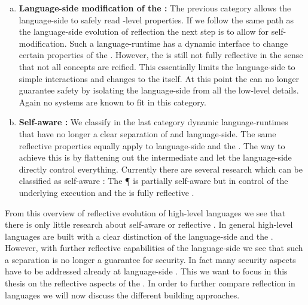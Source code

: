 \begin{enumerate}[a)]
\item \textbf{Language-side modification of the \VM:}
	The previous category allows the language-side to safely read \VM-level properties.
	If we follow the same path as the language-side evolution of reflection the next step is to allow for self-modification.
	Such a language-runtime has a dynamic interface to change certain properties of the \VM.
	However, the \VM is still not fully reflective in the sense that not all \VM concepts are reified.
	This essentially limits the language-side to simple interactions and changes to the \VM itself.
	At this point the \VM can no longer guarantee safety by isolating the language-side from all the low-level details.
	Again no systems are known to fit in this category.
	
\item \textbf{Self-aware \VM:}
	We classify in the last category dynamic language-runtimes that have no longer a clear separation of \VM and language-side.
	The same reflective properties equally apply to language-side and the \VM.
	The way to achieve this is by flattening out the intermediate \VM and let the language-side directly control everything.
	Currently there are several research \VMs which can be classified as self-aware \VMs: The \P \VM \cite{Verw12a} is partially self-aware but in control of the underlying execution and the \Klein \VM is fully reflective \cite{Unga05a}. 
\end{enumerate}

\noindent From this overview of reflective evolution of high-level languages we see that there is only little research about self-aware \VMs or reflective \VMs.
In general high-level languages are built with a clear distinction of the language-side and the \VM.
However, with further reflective capabilities of the language-side we see that such a separation is no longer a guarantee for security.
In fact many security aspects have to be addressed already at language-side \cite{??}.
This we want to focus in this thesis on the reflective aspects of the \VM.
In order to further compare reflection in languages we will now discuss the different \VM building approaches. 


